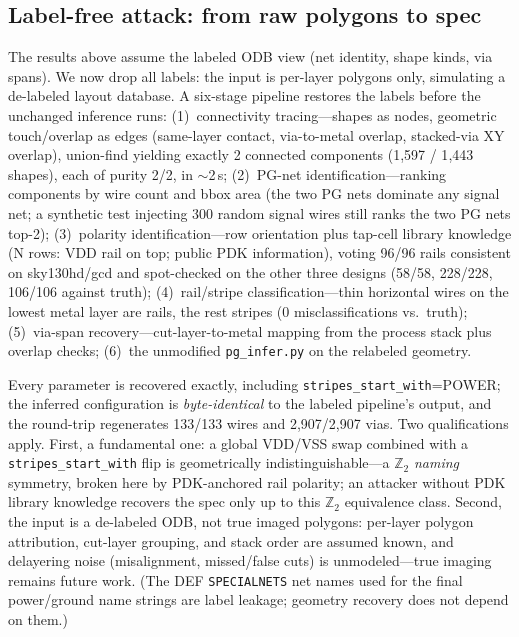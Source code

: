 \documentclass[11pt]{article}
\begin{document}
\subsection{Label-free attack: from raw polygons to spec}
\label{sec:unlabeled}

The results above assume the labeled ODB view (net identity, shape
kinds, via spans).  We now drop all labels: the input is per-layer
polygons only, simulating a de-labeled layout database.  A six-stage
pipeline restores the labels before the unchanged inference runs:
(1)~connectivity tracing---shapes as nodes, geometric touch/overlap as
edges (same-layer contact, via-to-metal overlap, stacked-via XY
overlap), union-find yielding exactly 2 connected components (1{,}597 /
1{,}443 shapes), each of purity 2/2, in $\sim$2\,s; (2)~PG-net
identification---ranking components by wire count and bbox area (the two
PG nets dominate any signal net; a synthetic test injecting 300 random
signal wires still ranks the two PG nets top-2); (3)~polarity
identification---row orientation plus tap-cell library knowledge
(N rows: VDD rail on top; public PDK information), voting 96/96
rails consistent on sky130hd/gcd and spot-checked on the other three
designs (58/58, 228/228, 106/106 against truth); (4)~rail/stripe
classification---thin horizontal wires on the lowest metal layer are
rails, the rest stripes (0 misclassifications vs.\ truth); (5)~via-span
recovery---cut-layer-to-metal mapping from the process stack plus overlap
checks; (6)~the unmodified \texttt{pg\_infer.py} on the relabeled
geometry.

Every parameter is recovered exactly, including
\texttt{stripes\_start\_with}=POWER; the inferred configuration is
\emph{byte-identical} to the labeled pipeline's output, and the
round-trip regenerates 133/133 wires and 2{,}907/2{,}907 vias.  Two
qualifications apply.  First, a fundamental one: a global VDD/VSS swap
combined with a \texttt{stripes\_start\_with} flip is geometrically
indistinguishable---a $\mathbb{Z}_2$ \emph{naming} symmetry, broken here
by PDK-anchored rail polarity; an attacker without PDK library knowledge
recovers the spec only up to this $\mathbb{Z}_2$ equivalence class.
Second, the input is a de-labeled ODB, not true imaged polygons:
per-layer polygon attribution, cut-layer grouping, and stack order are
assumed known, and delayering noise (misalignment, missed/false cuts) is
unmodeled---true imaging remains future work.  (The DEF
\texttt{SPECIALNETS} net names used for the final power/ground name
strings are label leakage; geometry recovery does not depend on them.)
\end{document}
